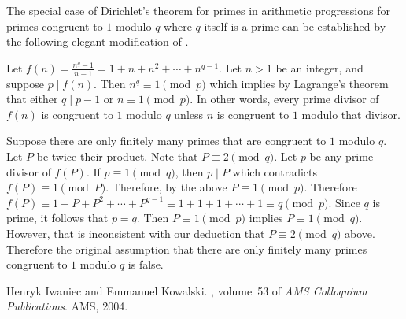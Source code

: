 \documentclass[12pt]{article}
\begin{document}
The special case of Dirichlet's theorem for primes in arithmetic progressions for primes congruent to $1$ modulo $q$ where $q$ itself is a prime can be established by the following elegant modification of .

Let $f(n)=\frac{n^q-1}{n-1}=1+n+n^2+\dotsb+n^{q-1}$. Let $n>1$ be an integer, and suppose $p\mid f(n)$. Then $n^q\equiv 1\pmod p$ which implies by Lagrange's theorem that either $q\mid p-1$ or $n\equiv 1\pmod p$. In other words, every prime divisor of $f(n)$ is congruent to $1$ modulo $q$ unless $n$ is congruent to $1$ modulo that divisor. 

Suppose there are only finitely many primes that are congruent to $1$ modulo $q$. Let $P$ be twice their product. Note that $P\equiv 2\pmod q$. Let $p$ be any prime divisor of $f(P)$. If $p\equiv 1\pmod q$, then $p\mid P$ which contradicts $f(P)\equiv 1\pmod P$. Therefore, by the above $P\equiv 1\pmod p$. Therefore $f(P)\equiv 1+P+P^2+\dotsb+P^{q-1}\equiv 1+1+1+\dotsb+1\equiv q\pmod p$. Since $q$ is prime, it follows that $p=q$. 
Then $P\equiv 1\pmod p$ implies $P\equiv 1\pmod q$. However, that is inconsistent with our deduction that $P\equiv 2\pmod q$ above. 
Therefore the original assumption that there are only finitely many primes congruent to $1$ modulo $q$ is false.

\begin{thebibliography}{1}

Henryk Iwaniec and Emmanuel Kowalski.
, volume~53 of {\em AMS Colloquium
  Publications}.
\newblock AMS, 2004.

\end{thebibliography}
\end{document}
